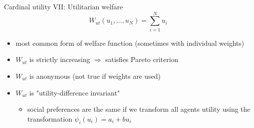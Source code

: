 \documentclass[bigger]{beamer}
\begin{document}
\begin{frame}[label={sec:org2af9bd8}]{Cardinal utility VII: Utilitarian welfare}
$$W_{ut}(u_1,\dots,u_N)=\sum_{i=1}^N u_i$$
\begin{itemize}
\item most common form of welfare function (sometimes with individual weights)
\item \(W_{ut}\) is strictly increasing \(\Rightarrow\) satisfies Pareto criterion
\item \(W_{ut}\) is anonymous (not true if weights are used)
\item \(W_{ut}\) is "utility-difference invariant"
\begin{itemize}
\item social preferences are the same if we transform all agents utility using the transformation \(\psi_i(u_i)=a_i+b u_i\)
\end{itemize}
\end{itemize}
\end{frame}
\end{document}
